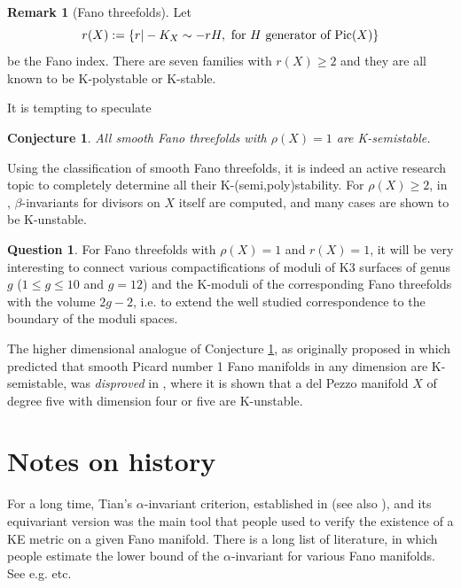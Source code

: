 \documentclass[12pt,reqno]{amsart}%
\newtheorem{conj}[thm]{Conjecture}
\theoremstyle{definition}
\newtheorem{ques}[thm]{Question}    %
\newtheorem{rem}[thm]{Remark}
\theoremstyle{remark}
\begin{document}
\begin{rem}[Fano threefolds]
 
 
 

 Let 
$$r(X):=\{r | -K_X\sim -rH, \mbox{ for $H$ generator of ${\rm Pic}(X)$} \}$$ be the Fano index. 
There are seven families with $r(X)\ge 2$ and they are all known to be K-polystable or K-stable. 

It is tempting to speculate
\begin{conj}\label{c-threefold}
All smooth Fano threefolds with $\rho(X)=1$ are K-semistable. 
\end{conj}

Using the classification of smooth Fano threefolds, it is indeed an active research topic to completely determine all their K-(semi,poly)stability.  For $\rho(X)\ge 2$, in \cite[Section 10]{Fuj16}, $\beta$-invariants for divisors on $X$ itself are computed, and many cases are shown to be K-unstable. 

\begin{ques}

For Fano threefolds with $\rho(X)=1$ and $r(X)=1$,  it will be very interesting to connect various compactifications of moduli of K3 surfaces of genus $g$ ($1\le g \le 10$ and $g=12$) and the K-moduli of the corresponding Fano threefolds with the volume $2g-2$, i.e. to extend the well studied correspondence to the boundary of the moduli spaces. 

\end{ques}
 
The higher dimensional analogue of Conjecture \ref{c-threefold}, as originally proposed in \cite[Conjecture 5.1]{OO13} which predicted that smooth Picard number 1 Fano  manifolds in any dimension  are K-semistable, was \emph{disproved} in \cite{Fuj17a}, where it is shown that a del Pezzo manifold $X$ of degree five with dimension four or five are K-unstable. 


\end{rem}

\section*{Notes on history}

For a long time, Tian's $\alpha$-invariant criterion, established in \cite{Tia87} (see also \cite{OS12}), and its equivariant version was the main tool that people used to verify the existence of a KE metric on a given Fano manifold. There is a long list of literature, in which people estimate the lower bound of the $\alpha$-invariant for various Fano manifolds. See e.g. \cite{Che01, Che08, CS09, CS18} etc.
\end{document}
